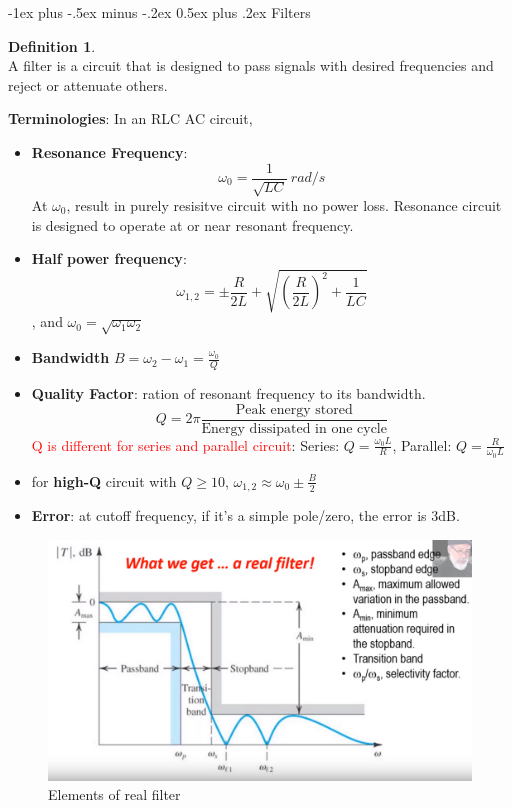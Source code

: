 \documentclass[10pt,landscape]{article}
\makeatletter
\renewcommand{\section}{\@startsection{section}{1}{0mm}%
                                {-1ex plus -.5ex minus -.2ex}%
                                {0.5ex plus .2ex}%
                                {\normalfont\large\bfseries}}
\newcommand\todo[1]{\textcolor{red}{#1}}
\theoremstyle{definition}
\newtheorem*{defin}{Definition}
\theoremstyle{remark}
\makeatother
\begin{document}
\begin{multicols}{3}
\section{Filters}
\begin{defin} \mbox{} \\
A filter is a circuit that is designed to pass signals with desired frequencies and reject or attenuate others. \\
\end{defin}

\textbf{Terminologies}: 
In an RLC AC circuit, 
\begin{itemize}[noitemsep,nolistsep]
    \item \textbf{Resonance Frequency}: $$\omega_0 = \frac{1}{\sqrt{LC}}\:rad/s$$ At $\omega_0$, result in purely resisitve circuit with no power loss. Resonance circuit is designed to operate at or near resonant frequency. 
    \item \textbf{Half power frequency}: \\
    $$\omega_{1,2} = \pm \frac{R}{2L} + \sqrt{(\frac{R}{2L})^2 + \frac{1}{LC}}$$, and $\omega_0 = \sqrt{\omega_1\omega_2}$
    \item \textbf{Bandwidth} $B = \omega_2 - \omega_1 = \frac{\omega_0}{Q}$
    \item \textbf{Quality Factor}: ration of resonant frequency to its bandwidth. $$Q = 2\pi \frac{\text{Peak energy stored}}{\text{Energy dissipated in one cycle}}$$ 
    \todo{Q is different for series and parallel circuit}: 
    Series: $Q = \frac{\omega_0L}{R}$, Parallel: $Q = \frac{R}{\omega_0 L}$
    \item for \textbf{high-Q} circuit with $Q \geq 10$, $\omega_{1,2} \approx \omega_0 \pm \frac{B}{2}$
    \item \textbf{Error}: at cutoff frequency, if it's a simple pole/zero, the error is 3dB. 
\end{itemize}

\begin{figure}[H]
    \centering
    \includegraphics[width=\linewidth]{202/figure/real_filter.png}
    \caption{Elements of real filter}
    \label{fig:real_filter}
\end{figure}



\end{multicols}
\end{document}
